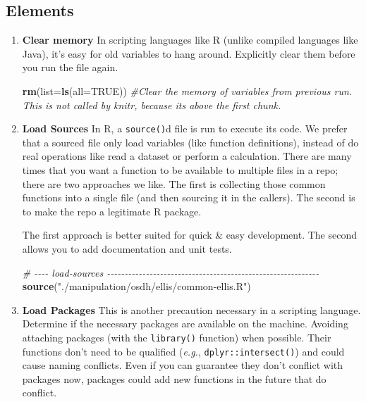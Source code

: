 \documentclass[
]{book}
\newenvironment{Shaded}{\begin{snugshade}}{\end{snugshade}}
\newcommand{\CommentTok}[1]{\textcolor[rgb]{0.56,0.35,0.01}{\textit{#1}}}
\newcommand{\DataTypeTok}[1]{\textcolor[rgb]{0.13,0.29,0.53}{#1}}
\newcommand{\KeywordTok}[1]{\textcolor[rgb]{0.13,0.29,0.53}{\textbf{#1}}}
\newcommand{\NormalTok}[1]{#1}
\newcommand{\OtherTok}[1]{\textcolor[rgb]{0.56,0.35,0.01}{#1}}
\newcommand{\StringTok}[1]{\textcolor[rgb]{0.31,0.60,0.02}{#1}}
\begin{document}
\hypertarget{elements}{%
\subsection{Elements}\label{elements}}

\begin{enumerate}
\def\labelenumi{\arabic{enumi}.}
\item
  \textbf{Clear memory} In scripting languages like R (unlike compiled languages like Java), it's easy for old variables to hang around. Explicitly clear them before you run the file again.

\begin{Shaded}
\begin{Highlighting}[]
\KeywordTok{rm}\NormalTok{(}\DataTypeTok{list=}\KeywordTok{ls}\NormalTok{(}\DataTypeTok{all=}\OtherTok{TRUE}\NormalTok{)) }\CommentTok{\#Clear the memory of variables from previous run. This is not called by knitr, because it\textquotesingle{}s above the first chunk.}
\end{Highlighting}
\end{Shaded}
\item
  \textbf{Load Sources} In R, a \texttt{source()}d file is run to execute its code. We prefer that a sourced file only load variables (like function definitions), instead of do real operations like read a dataset or perform a calculation. There are many times that you want a function to be available to multiple files in a repo; there are two approaches we like. The first is collecting those common functions into a single file (and then sourcing it in the callers). The second is to make the repo a legitimate R package.

  The first approach is better suited for quick \& easy development. The second allows you to add documentation and unit tests.

\begin{Shaded}
\begin{Highlighting}[]
\CommentTok{\# {-}{-}{-}{-} load{-}sources {-}{-}{-}{-}{-}{-}{-}{-}{-}{-}{-}{-}{-}{-}{-}{-}{-}{-}{-}{-}{-}{-}{-}{-}{-}{-}{-}{-}{-}{-}{-}{-}{-}{-}{-}{-}{-}{-}{-}{-}{-}{-}{-}{-}{-}{-}{-}{-}{-}{-}{-}{-}{-}{-}{-}{-}{-}{-}{-}{-}}
\KeywordTok{source}\NormalTok{(}\StringTok{"./manipulation/osdh/ellis/common{-}ellis.R"}\NormalTok{)}
\end{Highlighting}
\end{Shaded}
\item
  \textbf{Load Packages} This is another precaution necessary in a scripting language. Determine if the necessary packages are available on the machine. Avoiding attaching packages (with the \texttt{library()} function) when possible. Their functions don't need to be qualified (\emph{e.g.}, \texttt{dplyr::intersect()}) and could cause naming conflicts. Even if you can guarantee they don't conflict with packages now, packages could add new functions in the future that do conflict.


\end{enumerate}
\end{document}
